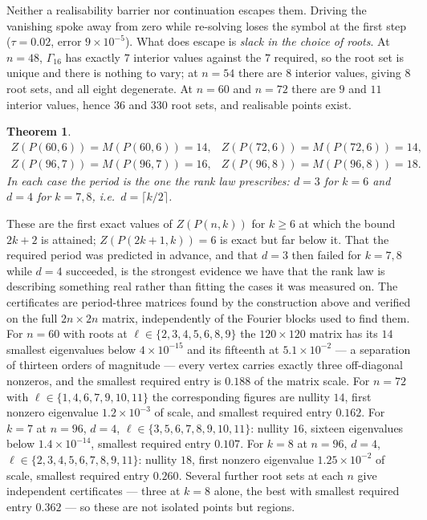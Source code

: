 \documentclass[11pt]{article}
\newtheorem{theorem}{Theorem}
\theoremstyle{definition}
\begin{document}
Neither a realisability barrier nor continuation escapes them. Driving the
vanishing spoke away from zero while re-solving loses the symbol at the first
step ($\tau=0.02$, error $9\times10^{-5}$). What does escape is \emph{slack in
the choice of roots}. At $n=48$, $\Gamma_{16}$ has exactly $7$ interior values
against the $7$ required, so the root set is unique and there is nothing to
vary; at $n=54$ there are $8$ interior values, giving $8$ root sets, and all
eight degenerate. At $n=60$ and $n=72$ there are $9$ and $11$ interior values,
hence $36$ and $330$ root sets, and realisable points exist.

\begin{theorem}\label{thm:k6}
\[
\begin{array}{ll}
 Z(P(60,6))=M(P(60,6))=14, & Z(P(72,6))=M(P(72,6))=14,\\[2pt]
 Z(P(96,7))=M(P(96,7))=16, & Z(P(96,8))=M(P(96,8))=18 .
\end{array}
\]
In each case the period is the one the rank law prescribes: $d=3$ for $k=6$ and
$d=4$ for $k=7,8$, i.e.\ $d=\lceil k/2\rceil$.
\end{theorem}

\noindent
These are the first exact values of $Z(P(n,k))$ for $k\ge6$ at which the bound
$2k+2$ is attained; $Z(P(2k+1,k))=6$ \cite[Thm.~2.6]{RST} is exact but far below
it. That the required
period was predicted in advance, and that $d=3$ then failed for $k=7,8$ while
$d=4$ succeeded, is the strongest evidence we have that the rank law is
describing something real rather than fitting the cases it was measured on. The
certificates are
period-three matrices found by the construction above and verified on the full
$2n\times2n$ matrix, independently of the Fourier blocks used to find them. For
$n=60$ with roots at $\ell\in\{2,3,4,5,6,8,9\}$ the $120\times120$ matrix has
its $14$ smallest eigenvalues below $4\times10^{-15}$ and its fifteenth at
$5.1\times10^{-2}$ --- a separation of thirteen orders of magnitude --- every
vertex carries exactly three off-diagonal nonzeros, and the smallest required
entry is $0.188$ of the matrix scale. For $n=72$ with
$\ell\in\{1,4,6,7,9,10,11\}$ the corresponding figures are nullity $14$, first
nonzero eigenvalue $1.2\times10^{-3}$ of scale, and smallest required entry
$0.162$. For $k=7$ at $n=96$, $d=4$, $\ell\in\{3,5,6,7,8,9,10,11\}$: nullity
$16$, sixteen eigenvalues below $1.4\times10^{-14}$, smallest required entry
$0.107$. For $k=8$ at $n=96$, $d=4$, $\ell\in\{2,3,4,5,6,7,8,9,11\}$: nullity
$18$, first nonzero eigenvalue $1.25\times10^{-2}$ of scale, smallest required
entry $0.260$. Several further root sets at each $n$ give independent
certificates --- three at $k=8$ alone, the best with smallest required entry
$0.362$ --- so these are not isolated points but regions.
\end{document}
